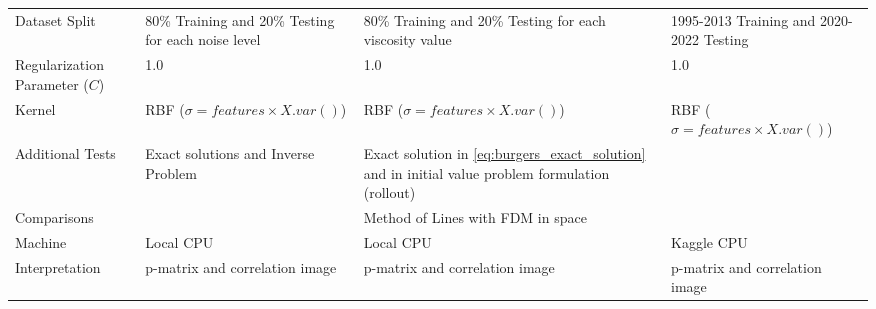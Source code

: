 \begin{table}[H]
\begin{tabularx}{\textwidth}{L{0.75}*{3}{L{1.09}}}
    Dataset Split                    & 80\% Training and 20\% Testing for each noise level & 80\% Training and 20\% Testing for each viscosity value                                               & 1995{-}2013 Training and 2020{-}2022 Testing \\\addlinespace[0.5em]
    Regularization Parameter (\(C\)) & 1.0                                                 & 1.0                                                                                                   & 1.0                                          \\\addlinespace[0.5em]
    Kernel                           & RBF (\(\sigma = features \times X.var()\))          & RBF (\(\sigma = features \times X.var()\))                                                            & RBF (\(\sigma = features \times X.var()\))   \\\addlinespace[0.5em]
    Additional Tests                 & Exact solutions and Inverse Problem                 & Exact solution in \cref{eq:burgers_exact_solution} and in initial value problem formulation (rollout) &                                              \\\addlinespace[0.5em]
    Comparisons                      &                                                     & Method of Lines with FDM in space                                                                     &                                              \\\addlinespace[0.5em]
    Machine                          & Local CPU                                           & Local CPU                                                                                             & Kaggle CPU                                   \\\addlinespace[0.5em]
    Interpretation                   & p-matrix and correlation image                      & p-matrix and correlation image                                                                        & p-matrix and correlation image               \\
    \bottomrule
  \end{tabularx}
\end{table}

